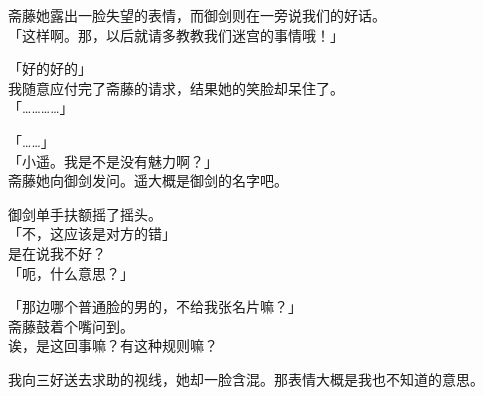 斋藤她露出一脸失望的表情，而御剑则在一旁说我们的好话。\\

「这样啊。那，以后就请多教教我们迷宫的事情哦！」

「好的好的」\\

我随意应付完了斋藤的请求，结果她的笑脸却呆住了。\\

「…………」

「……」\\

「小遥。我是不是没有魅力啊？」\\

斋藤她向御剑发问。遥大概是御剑的名字吧。

御剑单手扶额摇了摇头。\\

「不，这应该是对方的错」\\

是在说我不好？\\

「呃，什么意思？」

「那边哪个普通脸的男的，不给我张名片嘛？」\\

斋藤鼓着个嘴问到。\\

诶，是这回事嘛？有这种规则嘛？

我向三好送去求助的视线，她却一脸含混。那表情大概是我也不知道的意思。\\

